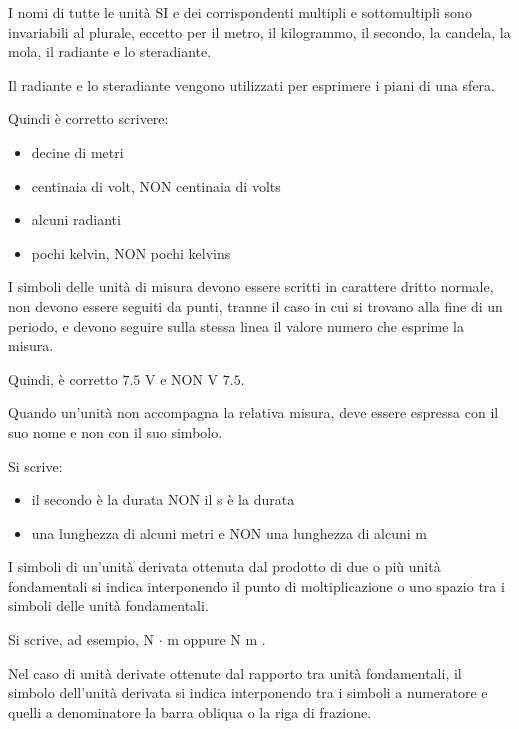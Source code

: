 I nomi di tutte le unità SI e dei corrispondenti multipli e sottomultipli sono invariabili 
al plurale, eccetto per il metro, il kilogrammo, il secondo, la candela, la mola, il radiante e lo steradiante. \newline 

Il radiante e lo steradiante vengono utilizzati per esprimere i piani di una sfera. \newline 

Quindi è corretto scrivere: 

\begin{itemize}
    \item decine di metri 
    \item centinaia di volt, NON centinaia di volts 
    \item alcuni radianti 
    \item pochi kelvin, NON pochi kelvins
\end{itemize}

I simboli delle unità di misura devono essere scritti in carattere dritto normale, 
non devono essere seguiti da punti, tranne il caso in cui si trovano alla fine di un periodo, 
e devono seguire sulla stessa linea il valore numero che esprime la misura. \newline 

Quindi, è corretto $7.5$ V e NON V $7.5$. \newline 

Quando un'unità non accompagna la relativa misura, 
deve essere espressa con il suo nome e non con il suo simbolo. \newline 

Si scrive: 

\begin{itemize}
    \item il secondo è la durata NON il s è la durata 
    \item una lunghezza di alcuni metri e NON una lunghezza di alcuni m
\end{itemize}

I simboli di un'unità derivata ottenuta dal prodotto di due o più unità fondamentali
si indica interponendo il punto di moltiplicazione o uno spazio tra i simboli delle unità fondamentali. \newline 

Si scrive, ad esempio, 
N $\cdot$ m oppure N m .\newline 

Nel caso di unità derivate ottenute dal rapporto tra unità fondamentali, 
il simbolo dell'unità derivata si indica interponendo tra i simboli a numeratore e quelli a denominatore 
la barra obliqua o la riga di frazione. \newline 

